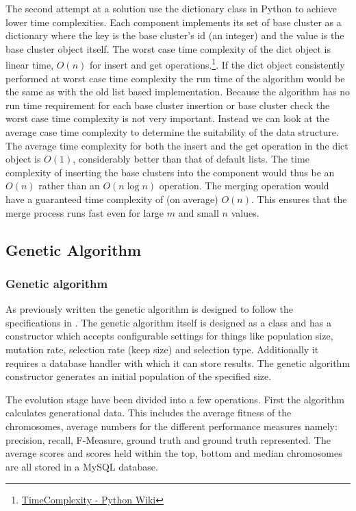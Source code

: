The second attempt at a solution use the dictionary class in Python to achieve lower time complexities. Each component implements its set of base cluster as a dictionary where the key is the base cluster's id (an integer) and the value is the base cluster object itself. The worst case time complexity of the dict object is linear time, \(O(n)\) for insert and get operations.\footnote{\href{https://wiki.python.org/moin/TimeComplexity}{TimeComplexity - Python Wiki}}. If the dict object consistently performed at worst case time complexity the run time of the algorithm would be the same as with the old list based implementation. Because the algorithm has no run time requirement for each base cluster insertion or base cluster check the worst case time complexity is not very important. Instead we can look at the average case time complexity to determine the suitability of the data structure. The average time complexity for both the insert and the get operation in the dict object is \(O(1)\), considerably better than that of default lists. The time complexity of inserting the base clusters into the component would thus be an \(O(n)\) rather than an \(O(n \log n)\) operation. The merging operation would have a guaranteed time complexity of (on average) \(O(n)\). This ensures that the merge process runs fast even for large \(m\) and small \(n\) values.

\subsection{Genetic Algorithm}

\subsubsection{Genetic algorithm}
As previously written the genetic algorithm is designed to follow the specifications in \cite{Goldberg1989,Negnevitsky2002,Haupt2004a}. The genetic algorithm itself is designed as a class and has a constructor which accepts configurable settings for things like population size, mutation rate, selection rate (keep size) and selection type. Additionally it requires a database handler with which it can store results. The genetic algorithm constructor generates an initial population of the specified size.

The evolution stage have been divided into a few operations. First the algorithm calculates generational data. This includes the average fitness of the chromosomes, average numbers for the different performance measures namely: precision, recall, F-Measure, ground truth and ground truth represented. The average scores and scores held within the top, bottom and median chromosomes are all stored in a MySQL database.

